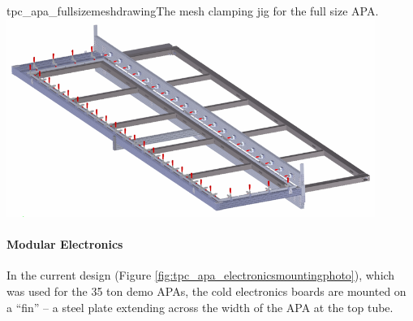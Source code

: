 \begin{cdrfigure}{tpc_apa_fullsizemeshdrawing}{The mesh clamping jig for the full size APA.}
\includegraphics[width=0.9\textwidth]{figures/tpc_apa_fullsizemeshdrawing.png} 
\end{cdrfigure}


\paragraph{Modular Electronics}
In the current design (Figure \ref{fig:tpc_apa_electronicsmountingphoto}), which was used for the 35 ton demo APAs, the cold electronics boards are mounted on a ``fin'' -- a steel plate extending across the width of the APA at the top tube.

